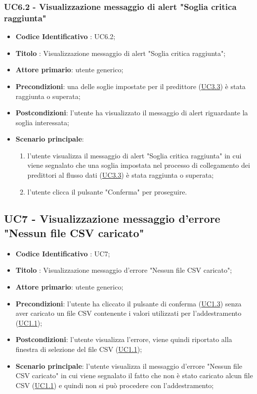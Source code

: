 		
		\label{par:UC6.2}
	\subsubsection{UC6.2 - Visualizzazione messaggio di alert "Soglia critica raggiunta"}
		\begin{itemize}
			\item\textbf{Codice Identificativo} : UC6.2;
			\item\textbf{Titolo} : Visualizzazione messaggio di alert "Soglia critica raggiunta";
			\item\textbf{Attore primario}: utente generico;
			\item\textbf{Precondizioni}: una delle soglie impostate per il predittore (\hyperref[par:UC3.3]{UC3.3}) è stata raggiunta o superata;
			\item\textbf{Postcondizioni}: l'utente ha visualizzato il messaggio di alert riguardante la soglia interessata;
			\item\textbf{Scenario principale}:
				\begin{enumerate}
					\item l'utente visualizza il messaggio di alert "Soglia critica raggiunta" in cui viene segnalato che una soglia impostata nel processo di collegamento dei predittori al flusso dati (\hyperref[par:UC3.3]{UC3.3}) è stata raggiunta o superata;
					\item l'utente clicca il pulsante "Conferma" per proseguire.		
				\end{enumerate}		
		\end{itemize}
	


	
	\label{par:UC7}
	\subsection{UC7 - Visualizzazione messaggio d'errore "Nessun file CSV caricato"}
		\begin{itemize}
			\item\textbf{Codice Identificativo} : UC7;
			\item\textbf{Titolo} : Visualizzazione messaggio d'errore "Nessun file CSV caricato";
			\item\textbf{Attore primario}: utente generico;
			\item\textbf{Precondizioni}: l'utente ha cliccato il pulsante di conferma (\hyperref[par:UC1.3]{UC1.3}) senza aver caricato un file CSV contenente i valori utilizzati per l'addestramento (\hyperref[par:UC1.1]{UC1.1});
			\item\textbf{Postcondizioni}: l'utente visualizza l'errore, viene quindi riportato alla finestra di selezione del file CSV (\hyperref[par:UC1.1]{UC1.1});
			\item\textbf{Scenario principale}: l'utente visualizza il messaggio d'errore "Nessun file CSV caricato" in cui viene segnalato il fatto che non è stato caricato alcun file CSV (\hyperref[par:UC1.1]{UC1.1}) e quindi non si può procedere con l'addestramento; 		
		\end{itemize}
		
